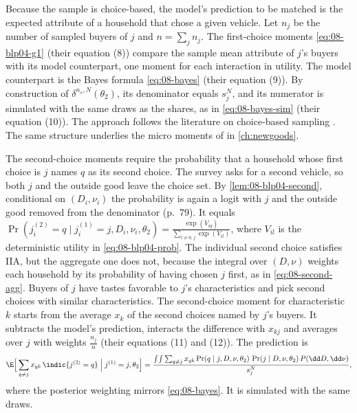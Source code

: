  Because the sample is choice-based, the model's prediction to
be matched is the expected attribute of a household that chose a given vehicle. Let $n_j$ be the number of
sampled buyers of $j$ and $n = \sum_j n_j$. The first-choice moments \eqref{eq:08-blp04-g1} (their equation (8))
compare the sample mean attribute of $j$'s buyers with its model counterpart, one moment for each interaction in
utility. The model counterpart is the Bayes formula \eqref{eq:08-bayes} (their equation (9)). By construction of
$\delta^{n_s,N}(\theta_2)$, its denominator equals $s^N_j$, and its numerator is simulated with the same draws as the
shares, as in \eqref{eq:08-bayes-sim} (their equation (10)). The approach follows the literature on choice-based
sampling \citep{ManskiLerman1977,ImbensLancaster1994}. The same structure underlies the micro moments of
\citet{Petrin2002} in \cref{ch:newgoods}.

 The second-choice moments require the probability that a household
whose first choice is $j$ names $q$ as its second choice. The survey asks for a second vehicle, so both $j$
and the outside good leave the choice set. By \cref{lem:08-blp04-second}, conditional on $(D_i, \nu_i)$ the
probability is again a logit with $j$ and the outside good removed from the denominator (p.~79). It equals
$\Pr(j^{(2)}_i = q \mid j^{(1)}_i = j, D_i, \nu_i, \theta_2) = \frac{\exp(V_{iq})}{\sum_{l \neq 0, j}\exp(V_{il})}$,
where $V_{il}$ is the deterministic utility in \eqref{eq:08-blp04-prob}. The individual second choice satisfies IIA, but
the aggregate one does not, because the integral over $(D,\nu)$ weights each household by its probability of having
chosen $j$ first, as in \eqref{eq:08-second-agg}. Buyers of $j$ have tastes favorable to $j$'s characteristics and pick
second choices with similar characteristics. The second-choice moment for characteristic $k$ starts from the average
$x_k$ of the second choices named by $j$'s buyers. It subtracts the model's prediction, interacts the difference with
$x_{kj}$ and averages over $j$ with weights $\frac{n_j}{n}$ (their equations (11) and (12)). The prediction is
\[
\E\Big[\sum_{q\neq j} x_{qk}\,\indic\{j^{(2)} = q\} \Bigm| j^{(1)} = j, \theta_2\Big]
= \frac{\int\!\int \sum_{q \neq j} x_{qk}\Pr(q \mid j, D, \nu, \theta_2)\,\Pr(j \mid D,\nu,\theta_2)\,P(\dd D,\dd\nu)}
{s_j^N},
\]
where the posterior weighting mirrors \eqref{eq:08-bayes}. It is simulated with the same draws.

